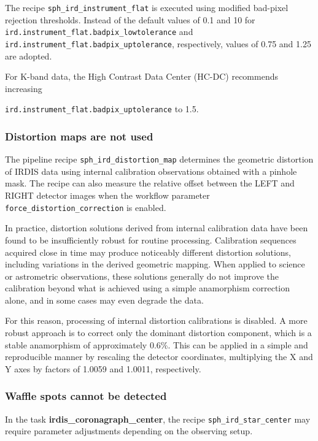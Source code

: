 The recipe \texttt{sph\_ird\_instrument\_flat} is executed using modified
bad-pixel rejection thresholds. Instead of the default values of
0.1 and 10 for
\texttt{ird.instrument\_flat.badpix\_lowtolerance} and
\texttt{ird.instrument\_flat.badpix\_uptolerance}, respectively,
values of 0.75 and 1.25 are adopted.

For K-band data, the High Contrast Data Center (HC-DC) recommends
increasing

\texttt{ird.instrument\_flat.badpix\_uptolerance}
to 1.5.

\subsubsection{Distortion maps are not used}
\label{sec:distortion_map}

The pipeline recipe \texttt{sph\_ird\_distortion\_map} determines the
geometric distortion of IRDIS data using internal calibration
observations obtained with a pinhole mask. The recipe can also measure
the relative offset between the LEFT and RIGHT detector images when the
workflow parameter
\texttt{force\_distortion\_correction}
is enabled.

In practice, distortion solutions derived from internal calibration data
have been found to be insufficiently robust for routine processing.
Calibration sequences acquired close in time may produce noticeably
different distortion solutions, including variations in the derived
geometric mapping. When applied to science or astrometric observations,
these solutions generally do not improve the calibration beyond what is
achieved using a simple anamorphism correction alone, and in some cases
may even degrade the data.

For this reason, processing of internal distortion calibrations is
disabled. A more robust approach is to correct only the dominant
distortion component, which is a stable anamorphism of approximately
0.6\%. This can be applied in a simple and reproducible manner by
rescaling the detector coordinates, multiplying the X and Y axes by
factors of 1.0059 and 1.0011, respectively.

\subsubsection{Waffle spots cannot be detected}
\label{sec:img_coro}

In the task \textbf{irdis\_coronagraph\_center}, the recipe
\texttt{sph\_ird\_star\_center} may require parameter adjustments
depending on the observing setup.

